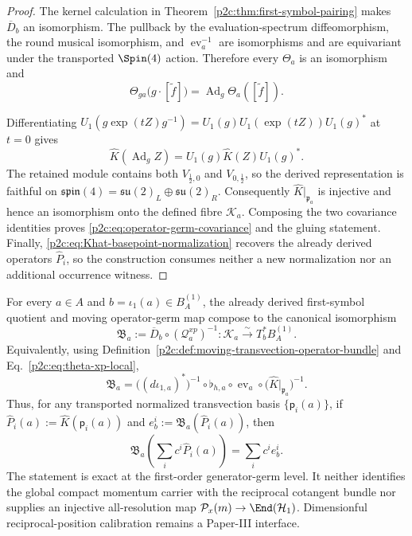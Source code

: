 \documentclass[12pt,a4paper]{article}
\begin{document}
\begin{proof}
The kernel calculation in
Theorem~\ref{p2c:thm:first-symbol-pairing} makes \(\overline D_b\) an
isomorphism.  The pullback by the evaluation-spectrum diffeomorphism, the
round musical isomorphism, and
\(\operatorname{ev}_a^{-1}\) are isomorphisms and are equivariant under the
transported \(\Spin(4)\) action.  Therefore every \(\Theta_a\) is an
isomorphism and
\[
 \Theta_{ga}\bigl(g\cdot[\widetilde f]\bigr)
 =\operatorname{Ad}_g\Theta_a([\widetilde f]).
\]

Differentiating
\(U_1(g\exp(tZ)g^{-1})
=U_1(g)U_1(\exp(tZ))U_1(g)^*\) at \(t=0\) gives
\begin{equation}
 \label{p2c:eq:Khat-adjoint-covariance}
 \widehat K(\operatorname{Ad}_gZ)
 =U_1(g)\widehat K(Z)U_1(g)^*.
\end{equation}
The retained module contains both
\(V_{\frac12,0}\) and \(V_{0,\frac12}\), so the derived representation is
faithful on
\(\mathfrak{spin}(4)=\mathfrak{su}(2)_L\oplus\mathfrak{su}(2)_R\).
Consequently \(\widehat K|_{\mathfrak p_a}\) is injective and hence an
isomorphism onto the defined fibre \(\mathscr K_a\).  Composing the two
covariance identities proves
\eqref{p2c:eq:operator-germ-covariance} and the gluing statement.  Finally,
\eqref{p2c:eq:Khat-basepoint-normalization} recovers the already derived
operators \(\widehat P_i\), so the construction consumes neither a new
normalization nor an additional occurrence witness.
\end{proof}

\begin{corollary}
\label{p2c:cor:compact-transvection-cotangent-germ}
For every $a\in A$ and $b=\iota_1(a)\in B_A^{(1)}$, the already derived
first-symbol quotient and moving operator-germ map compose to the canonical
isomorphism
\begin{equation}
 \label{p2c:eq:compact-transvection-cotangent-germ}
 \boxed{
 \mathfrak B_a
 :=\overline D_b\circ(\mathcal Q_a^{xp})^{-1}:
 \mathscr K_a\overset\sim\longrightarrow T_b^*B_A^{(1)}.}
\end{equation}
Equivalently, using Definition~\ref{p2c:def:moving-transvection-operator-bundle}
and Eq.~\eqref{p2c:eq:theta-xp-local},
\begin{equation}
 \label{p2c:eq:compact-transvection-cotangent-expanded}
 \boxed{
 \mathfrak B_a
 =\bigl((d\iota_{1,a})^*\bigr)^{-1}
 \circ\flat_{h,a}\circ\operatorname{ev}_a
 \circ\bigl(\widehat K|_{\mathfrak p_a}\bigr)^{-1}.}
\end{equation}
Thus, for any transported normalized transvection basis
$\{\mathsf p_i(a)\}$, if
$\widehat P_i(a):=\widehat K(\mathsf p_i(a))$ and
$e_b^i:=\mathfrak B_a(\widehat P_i(a))$, then
\[
 \mathfrak B_a\!\left(\sum_i c^i\widehat P_i(a)\right)
 =\sum_i c^i e_b^i.
\]
The statement is exact at the first-order generator-germ level.  It neither
identifies the global compact momentum carrier with the reciprocal cotangent
bundle nor supplies an injective all-resolution map
$\mathcal P_x(m)\to\End(\mathcal H_1)$.  Dimensionful reciprocal-position
calibration remains a Paper-III interface.
\end{corollary}
\end{document}
